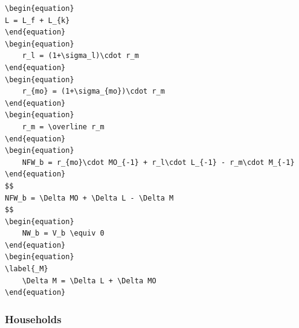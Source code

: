 \documentclass[12pt]{article}
\begin{document}
\begin{verbatim}
\begin{equation}
L = L_f + L_{k}
\end{equation}
\begin{equation}
    r_l = (1+\sigma_l)\cdot r_m
\end{equation}
\begin{equation}
    r_{mo} = (1+\sigma_{mo})\cdot r_m
\end{equation}
\begin{equation}
    r_m = \overline r_m
\end{equation}
\begin{equation}
    NFW_b = r_{mo}\cdot MO_{-1} + r_l\cdot L_{-1} - r_m\cdot M_{-1}
\end{equation}
$$
NFW_b = \Delta MO + \Delta L - \Delta M
$$
\begin{equation}
    NW_b = V_b \equiv 0
\end{equation}
\begin{equation}
\label{_M}
    \Delta M = \Delta L + \Delta MO
\end{equation}
\end{verbatim}

\subsubsection{Households}
\label{sec:org1f48e6d}
\end{document}
